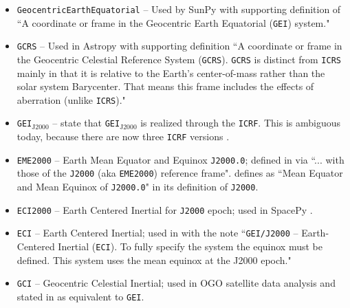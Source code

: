 \documentclass[draft]{agujournal2019}
\begin{document}
\begin{itemize}
    \item \texttt{GeocentricEarthEquatorial} -- Used by SunPy \cite{SunPy} with supporting definition of ``A coordinate or frame in the Geocentric Earth Equatorial (\texttt{GEI}) system."
    
    \item \texttt{GCRS} --  Used in Astropy \cite{AstroPy2022} with supporting definition ``A coordinate or frame in the Geocentric Celestial Reference System (\texttt{GCRS}). \texttt{GCRS} is distinct from \texttt{ICRS} mainly in that it is relative to the Earth’s center-of-mass rather than the solar system Barycenter. That means this frame includes the effects of aberration (unlike \texttt{ICRS})."

    \item \texttt{GEI}$_\mathrm{J2000}$ --  state that \texttt{GEI}$_\mathrm{J2000}$ is realized through the \texttt{ICRF}. This is ambiguous today, because there are now three \texttt{ICRF} versions \cite{Charlot2020}.

    \item \texttt{EME2000} -- Earth Mean Equator and Equinox \texttt{J2000.0}; defined in  via ``... with those of the \texttt{J2000} (aka \texttt{EME2000}) reference frame".  defines as ``Mean Equator and Mean Equinox of \texttt{J2000.0}" in its definition of \texttt{J2000}.

    \item \texttt{ECI2000} -- Earth Centered Inertial for \texttt{J2000} epoch; used in SpacePy \cite{Niehof2022}.

    \item \texttt{ECI} -- Earth Centered Inertial; used in  with the note ``\texttt{GEI/J2000} – Earth-Centered Inertial (\texttt{ECI}). To fully specify the system the equinox must be defined. This system uses the mean equinox at the J2000 epoch."


   \item \texttt{GCI} -- Geocentric Celestial Inertial; used in OGO satellite data analysis \cite{NASA1970} and stated in  as equivalent to \texttt{GEI}.



\end{itemize}
\end{document}
